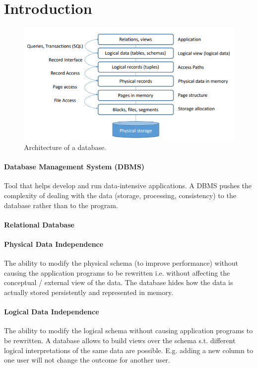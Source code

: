 \section{Introduction}

\begin{figure}[h]
	\centering
	\includegraphics[scale=0.8]{images/00-arch.PNG}
	\caption{Architecture of a database.}
	\label{fig:arch}
\end{figure}

\paragraph{Database Management System (DBMS)}
Tool that helps develop and run data-intensive applications. A DBMS pushes the complexity of dealing with the data (storage, processing, consistency) to the database rather than to the program.

\paragraph{Relational Database}

\paragraph{Physical Data Independence}
The ability to modify the physical schema (to improve performance) without causing the application programs to be rewritten i.e. without affecting the conceptual / external view of the data. The database hides how the data is actually stored persistently and represented in memory.

\paragraph{Logical Data Independence}
The ability to modify the logical schema without causing application programs to be rewritten. A database allows to build views over the schema s.t. different logical interpretations of the same data are possible. E.g. adding a new column to one user will not change the outcome for another user.

